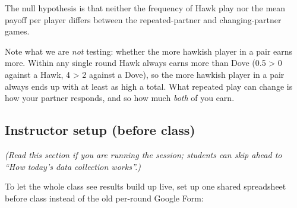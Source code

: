 \documentclass[
  a4paper]{book}
\begin{document}
The null hypothesis is that neither the frequency of Hawk play nor the mean payoff per player differs between the repeated-partner and changing-partner games.

Note what we are \emph{not} testing: whether the more hawkish player in a pair earns more. Within any single round Hawk always earns more than Dove (0.5 \textgreater{} 0 against a Hawk, 4 \textgreater{} 2 against a Dove), so the more hawkish player in a pair always ends up with at least as high a total. What repeated play can change is how your partner responds, and so how much \emph{both} of you earn.

\subsection{Instructor setup (before class)}\label{instructor-setup-before-class}

\emph{(Read this section if you are running the session; students can skip ahead to ``How today's data collection works''.)}

To let the whole class see results build up live, set up one shared spreadsheet before class instead of the old per-round Google Form:
\end{document}
